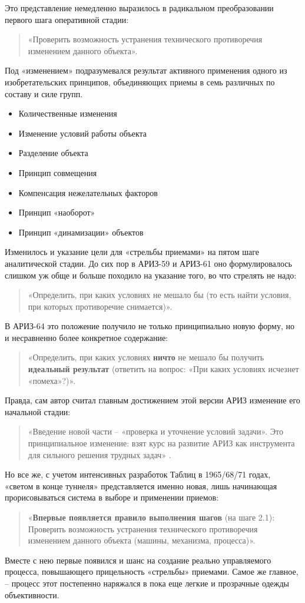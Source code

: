 \documentclass[11pt,a4paper]{article}
\begin{document}
Это представление немедленно выразилось в радикальном преобразовании первого
шага оперативной стадии:
\begin{quote}
  «Проверить возможность устранения технического противоречия изменением
  данного объекта».
\end{quote}
Под «изменением» подразумевался результат активного применения одного из
изобретательских принципов, объединяющих приемы в семь различных по составу и
силе групп.
\begin{itemize}
\item Количественные изменения
\item Изменение условий работы объекта
\item Разделение объекта
\item Принцип совмещения
\item Компенсация нежелательных факторов
\item Принцип «наоборот»
\item Принцип «динамизации» объектов
\end{itemize}
Изменилось и указание цели для «стрельбы приемами» на пятом шаге аналитической
стадии. До сих пор в АРИЗ-59 и АРИЗ-61 оно формулировалось слишком уж обще и
больше походило на указание того, во что стрелять не надо:
\begin{quote}
  «Определить, при каких условиях не мешало бы (то есть найти условия, при
  которых противоречие снимается)».
\end{quote}
В АРИЗ-64 это положение получило не только принципиально новую форму, но и
несравненно более конкретное содержание:
\begin{quote}
  «Определить, при каких условиях \textbf{ничто} не мешало бы получить
  \textbf{идеальный результат} (ответить на вопрос: «При каких условиях
  исчезнет «помеха»?)».
\end{quote}
Правда, сам автор считал главным достижением этой версии АРИЗ изменение его
начальной стадии:
\begin{quote}  
  «Введение новой части -- «проверка и уточнение условий задачи». Это
  принципиальное изменение: взят курс на развитие АРИЗ как инструмента для
  сильного решения трудных задач» \cite{Altshuller1986a}.
\end{quote}
Но все же, с учетом интенсивных разработок Таблиц в 1965/68/71 годах, «светом
в конце туннеля» представляется именно новая, лишь начинающая прорисовываться
система в выборе и применении приемов:
\begin{quote}
  «\textbf{Впервые появляется правило выполнения шагов} (на шаге 2.1):
  Проверить возможность устранения технического противоречия изменением
  данного объекта (машины, механизма, процесса)».
\end{quote}
Вместе с нею первые появился и шанс на создание реально управляемого процесса,
повышающего прицельность «стрельбы» приемами. Самое же главное, -- процесс
этот постепенно наряжался в пока еще легкие и прозрачные одежды объективности.
\end{document}

